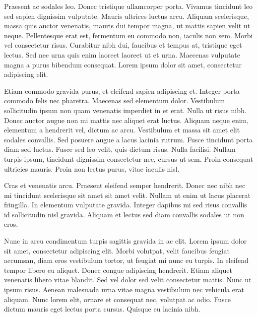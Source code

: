 \documentclass[landscape,final,a1paper,fontscale=0.45]{baposter}
\begin{document}
\begin{poster}
{Praesent ac sodales leo. Donec tristique ullamcorper porta. Vivamus tincidunt leo sed sapien dignissim vulputate. Mauris ultrices luctus arcu. Aliquam scelerisque, massa quis auctor venenatis, mauris dui tempor magna, ut mattis sapien velit ut neque. Pellentesque erat est, fermentum eu commodo non, iaculis non sem. Morbi vel consectetur risus. Curabitur nibh dui, faucibus et tempus at, tristique eget lectus. Sed nec urna quis enim laoreet laoreet ut et urna. Maecenas vulputate magna a purus bibendum consequat. Lorem ipsum dolor sit amet, consectetur adipiscing elit.

Etiam commodo gravida purus, et eleifend sapien adipiscing et. Integer porta commodo felis nec pharetra. Maecenas sed elementum dolor. Vestibulum sollicitudin ipsum non quam venenatis imperdiet in et erat. Nulla ut risus nibh. Donec auctor augue non mi mattis nec aliquet erat luctus. Aliquam neque enim, elementum a hendrerit vel, dictum ac arcu. Vestibulum et massa sit amet elit sodales convallis. Sed posuere augue a lacus lacinia rutrum. Fusce tincidunt porta diam sed luctus. Fusce sed leo velit, quis dictum risus. Nulla facilisi. Nullam turpis ipsum, tincidunt dignissim consectetur nec, cursus ut sem. Proin consequat ultricies mauris. Proin non lectus purus, vitae iaculis nisl.  

Cras et venenatis arcu. Praesent eleifend semper hendrerit. Donec nec nibh nec mi tincidunt scelerisque sit amet sit amet velit. Nullam ut enim ut lacus placerat fringilla. In elementum vulputate gravida. Integer dapibus mi sed risus convallis id sollicitudin nisl gravida. Aliquam et lectus sed diam convallis sodales ut non eros.

Nunc in arcu condimentum turpis sagittis gravida in ac elit. Lorem ipsum dolor sit amet, consectetur adipiscing elit. Morbi volutpat, velit faucibus feugiat accumsan, diam eros vestibulum tortor, ut feugiat mi nunc eu turpis. In eleifend tempor libero eu aliquet. Donec congue adipiscing hendrerit. Etiam aliquet venenatis libero vitae blandit. Sed vel dolor sed velit consectetur mattis. Nunc ut ipsum risus. Aenean malesuada urna vitae magna vestibulum nec vehicula erat aliquam. Nunc lorem elit, ornare et consequat nec, volutpat ac odio. Fusce dictum mauris eget lectus porta cursus. Quisque eu lacinia nibh.
  \begin{center}
  

\end{center}}
\end{poster}
\end{document}
